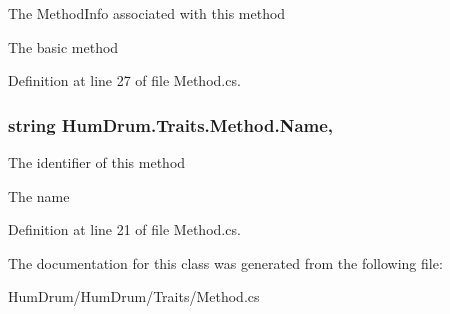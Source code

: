 The Method\+Info associated with this method 

The basic method

Definition at line 27 of file Method.\+cs.

\subsubsection[{\texorpdfstring{Name}{Name}}]{\setlength{\rightskip}{0pt plus 5cm}string Hum\+Drum.\+Traits.\+Method.\+Name\hspace{0.3cm}{\ttfamily [get]}, {\ttfamily [set]}}\hypertarget{classHumDrum_1_1Traits_1_1Method_a2ae0ff4da65edaa5aa29dc57a876ffab}{}\label{classHumDrum_1_1Traits_1_1Method_a2ae0ff4da65edaa5aa29dc57a876ffab}


The identifier of this method 

The name

Definition at line 21 of file Method.\+cs.



The documentation for this class was generated from the following file\+:\begin{DoxyCompactItemize}
\item 
Hum\+Drum/\+Hum\+Drum/\+Traits/Method.\+cs\end{DoxyCompactItemize}
